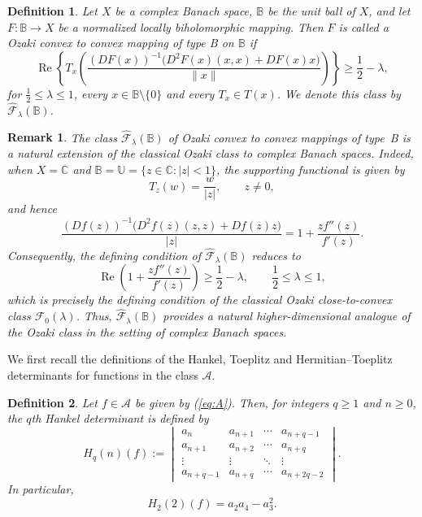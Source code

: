 \documentclass[11pt, reqno]{amsart}
\newtheorem{defi}{Definition}[section]
\newtheorem{rem}{Remark}[section]
\numberwithin{equation}{section}
\begin{document}
\begin{defi}
Let \(X\) be a complex Banach space, \(\mathbb{B}\) be the unit ball of \(X\), and let
\(F:\mathbb{B}\to X\) be a normalized locally biholomorphic mapping.
Then \(F\) is called a \emph{Ozaki convex to convex mapping of type B} on
\(\mathbb{B}\) if
\[
\operatorname{Re}\left\{
T_x\!\left(\frac{(DF(x))^{-1}\bigl(D^2F(x)(x,x)+DF(x)x\bigr)}{\parallel x\parallel} 
\right)
\right\}\geq \frac{1}{2}-\lambda,
\]
for $\frac{1}{2}\leq \lambda \leq 1$, every \(x\in\mathbb{B}\setminus\{0\}\) and every \(T_x\in T(x)\). We denote this class by $\widehat{\mathcal{F}}_{\lambda}(\mathbb{B})$.
\end{defi}
\begin{rem}
The class \(\widehat{\mathcal{F}}_{\lambda}(\mathbb{B})\) of Ozaki convex to convex mappings of type~B is a natural extension of the classical Ozaki class to complex Banach spaces. Indeed, when \(X=\mathbb{C}\) and \(\mathbb{B}=\mathbb{U}=\{z\in\mathbb{C}:|z|<1\}\), the supporting functional is given by
\[
T_z(w)=\frac{w}{|z|}, \qquad z\neq 0,
\]
and hence
\[
\frac{(Df(z))^{-1}\bigl(D^{2}f(z)(z,z)+Df(z)z\bigr)}{|z|}= 1+\frac{zf''(z)}{f'(z)}.
\]
Consequently, the defining condition of \(\widehat{\mathcal{F}}_{\lambda}(\mathbb{B})\) reduces to
\[
\operatorname{Re}\left(1+\frac{zf''(z)}{f'(z)}\right)\geq\frac{1}{2}-\lambda, \qquad \frac{1}{2}\le\lambda\le 1,
\]
which is precisely the defining condition of the classical Ozaki close-to-convex class \(\mathcal{F}_0(\lambda)\). Thus, \(\widehat{\mathcal{F}}_{\lambda}(\mathbb{B})\) provides a natural higher-dimensional analogue of the Ozaki class in the setting of complex Banach spaces.
\end{rem}
We first recall the definitions of the Hankel, Toeplitz and Hermitian--Toeplitz determinants for functions in the class $\mathcal{A}$.

\begin{defi}
Let \(f\in\mathcal{A}\) be given by (\ref{eq:A}). Then, for integers \(q\geq 1\) and \(n\geq 0\), the \(q\)th Hankel determinant is defined by
\[
H_q(n)(f):=
\begin{vmatrix}
a_n & a_{n+1} & \cdots & a_{n+q-1}\\
a_{n+1} & a_{n+2} & \cdots & a_{n+q}\\
\vdots & \vdots & \ddots & \vdots\\
a_{n+q-1} & a_{n+q} & \cdots & a_{n+2q-2}
\end{vmatrix}.
\]
In particular,
\[
H_2(2)(f)=a_2a_4-a_3^2.
\]
\end{defi}
\end{document}
